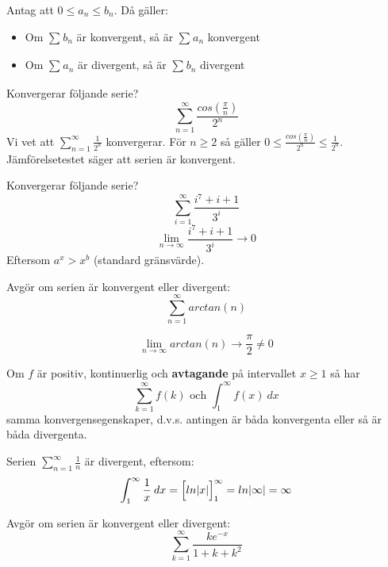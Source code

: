 \documentclass{report}
\begin{document}
{
 Antag att $ 0 \le a_n \le b_n $. Då gäller:
 \begin{itemize}
 	\item Om $ \sum_{}^{} b_n $ är konvergent, så är $ \sum_{}^{} a_n $ konvergent
	\item Om $ \sum_{}^{} a_n $ är divergent, så är $ \sum_{}^{} b_n $ divergent
 \end{itemize}
}

\ex{}
{
Konvergerar följande serie?
\begin{equation*}
\sum_{n = 1}^{ \infty} \frac{cos( \frac{\pi}{n} )}{2^n} 
\end{equation*}
Vi vet att $ \sum_{n = 1}^{ \infty} \frac{1}{2^n}  $ konvergerar. För $ n \ge 2 $ så gäller $ 0 \le \frac{cos( \frac{\pi}{n} )}{2^n} \le \frac{1}{2^n}   $. Jämförelsetestet säger att serien är konvergent. 
}

\ex{}
{
Konvergerar följande serie?
\begin{equation*}
	\sum_{i = 1}^{ \infty} \frac{i^7+i+1}{3^i} 
\end{equation*}
\begin{equation*}
	\lim_{n \to \infty} \frac{i^7+i+1}{3^i} \to 0	
\end{equation*}
Eftersom $ a^x > x^b $ (standard gränsvärde).
}

\qs{}
{
Avgör om serien är konvergent eller divergent:
\begin{equation*}
\sum_{n = 1}^{ \infty} arctan(n)
\end{equation*}
}

\sol
\begin{equation*}
\lim_{n \to \infty} arctan(n) \to \frac{\pi}{2} \ne 0
\end{equation*}

{
Om $ f $ är positiv, kontinuerlig och \textbf{avtagande} på intervallet $ x \ge 1 $ så har
\begin{equation*}
\sum_{k = 1}^{ \infty} f(k) \text{ och } \int_{1}^{ \infty} f(x) \: dx 
\end{equation*}
samma konvergensegenskaper, d.v.s. antingen är båda konvergenta eller så är båda divergenta.
}

\ex{}
{
Serien $ \sum_{n = 1}^{ \infty} \frac{1}{n}  $ är divergent, eftersom:
\begin{equation*}
		\int_{1}^{ \infty} \frac{1}{x}  \: dx = \Bigl[ ln|x| \Bigr]_{1}^{ \infty } = ln| \infty| = \infty
\end{equation*}
}

\qs{}
{
Avgör om serien är konvergent eller divergent:
\begin{equation*}
	\sum_{k = 1}^{ \infty} \frac{ke^{-x}}{1+k+k^2} 
\end{equation*}
}
\end{document}
